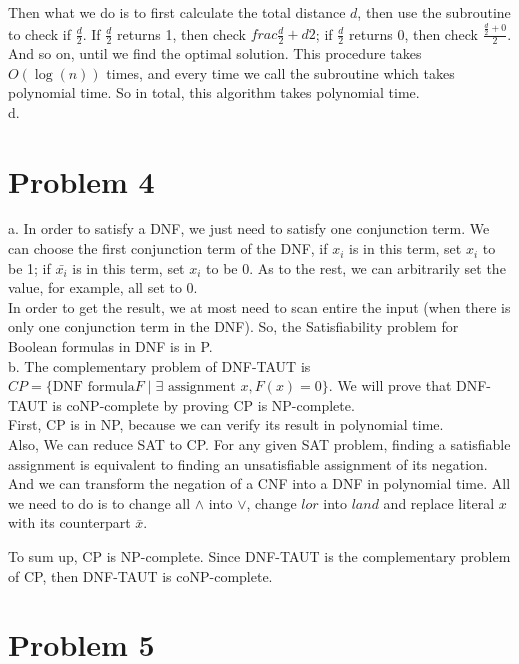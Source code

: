 \documentclass[12pt]{article}
\begin{document}
Then what we do is to first calculate the total distance $d$, then use
the subroutine to check if $\frac {d}{2}$. If $\frac {d}{2}$ returns
1, then check $frac {\frac {d}{2} + d}{2}$; if $\frac {d}{2}$ returns 0,
then check $\frac {\frac {d}{2} + 0}{2}$. And so on, until we find the
optimal solution. This procedure takes $O(\log {(n)})$ times, and
every time we call the subroutine which takes polynomial time. So in
total, this algorithm takes polynomial time. \\

d. 


\section*{Problem 4}

a. In order to satisfy a DNF, we just need to satisfy one conjunction
term. We can choose the first conjunction term of the DNF, if $x_i$ is
in this term, set $x_i$ to be 1; if $\bar {x_i}$ is in this term, set
$x_i$ to be 0. As to the rest, we can arbitrarily set the value, for
example, all set to 0. \\

In order to get the result, we at most need to scan entire the input
(when there is only one conjunction term in the DNF). So, the
Satisfiability problem for Boolean formulas in DNF is in P. \\

b. The complementary problem of DNF-TAUT is $CP = \{ \text{DNF formula
} F \; | \; \exists \text { assignment } x, F(x) = 0 \}$. We will
prove that DNF-TAUT is coNP-complete by proving CP is NP-complete. \\ 


First, CP is in NP, because we can verify its result in polynomial
time. \\

Also, We can reduce SAT to CP. For any given SAT problem, finding a
satisfiable assignment is equivalent to finding an unsatisfiable
assignment of its negation. And we can transform the negation of a CNF
into a DNF in polynomial time. All we need to do is to change all
$\land$ into $\lor$, change $lor$ into $land$ and replace literal $x$
with its counterpart $\bar {x}$.

To sum up, CP is NP-complete. Since DNF-TAUT is the complementary
problem of CP, then DNF-TAUT is coNP-complete.

\section*{Problem 5}
\end{document}
